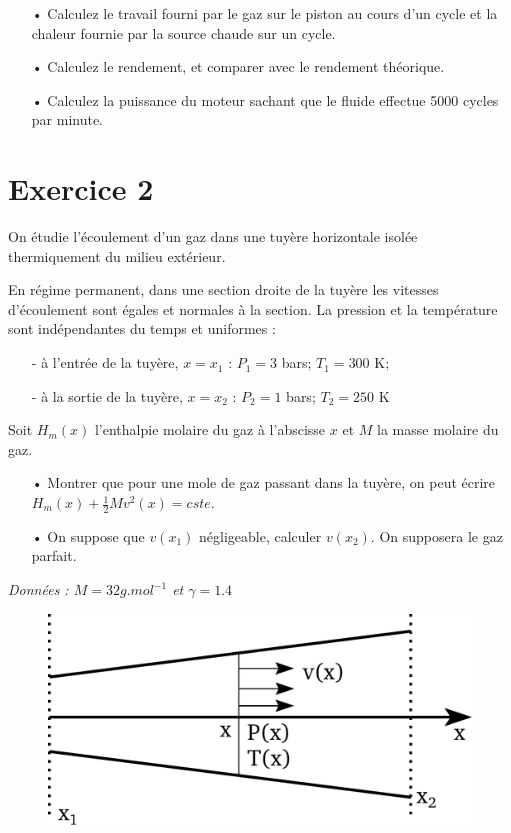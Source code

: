 \documentclass{report}
\begin{document}
\begin{itemize}
\item[•] Calculez le travail fourni par le gaz sur le piston au cours d'un cycle et la chaleur fournie par la source chaude sur un cycle.
\item[•] Calculez le rendement, et comparer avec le rendement théorique.
\item[•] Calculez la puissance du moteur sachant que le fluide effectue 5000 cycles par minute. 
\end{itemize}

\newpage

\section*{Exercice 2}

On étudie l'écoulement d'un gaz dans une tuyère horizontale isolée thermiquement du milieu extérieur.

En régime permanent, dans une section droite de la tuyère les vitesses d'écoulement sont égales et normales à la section. La pression et la température sont indépendantes du temps et uniformes :
\begin{itemize}
\item[-]à l'entrée de la tuyère, $x=x_{1}$ : $P_{1} = 3$ bars; $T_{1} = 300$ K;
\item[-]à la sortie de la tuyère, $x=x_{2}$ : $P_{2} = 1$ bars; $T_{2} = 250$ K
\end{itemize}

Soit $H_{m}(x)$ l'enthalpie molaire du gaz à l'abscisse $x$ et $M$ la masse molaire du gaz. 

\begin{itemize}
\item[•] Montrer que pour une mole de gaz passant dans la tuyère, on peut écrire $H_{m}(x)+\frac{1}{2}Mv^{2}(x)= cste$.
\item[•] On suppose que $v(x_{1})$ négligeable, calculer $v(x_{2})$. On supposera le gaz parfait. 
\end{itemize}

\textit{Données : $M = 32g.mol^{-1}$ et $\gamma=1.4$}

\begin{figure}[!h]
\centering
\includegraphics[width=0.4\linewidth]{turbine.pdf}
\end{figure}
\end{document}

